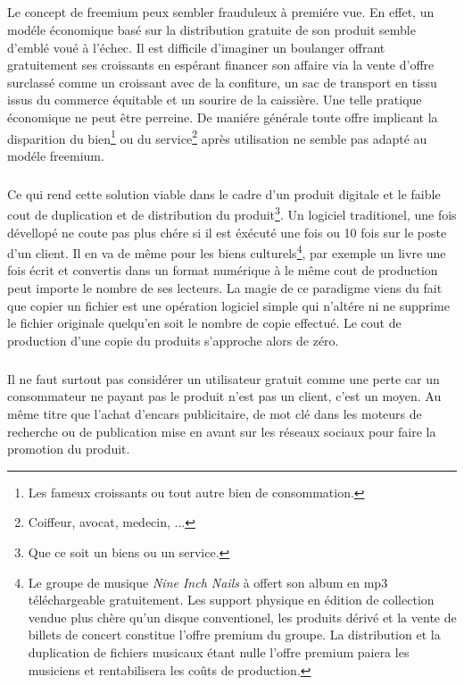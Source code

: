 \documentclass[11pt, a4paper ]{article}
\begin{document}
\begin{spacing}{1.5}
\paragraph{} %
	\subparagraph{} %
Le concept de freemium peux sembler frauduleux à premiére vue. En effet, un modéle économique basé sur la distribution gratuite de son produit semble d'emblé voué à l'échec. Il est difficile d'imaginer un boulanger offrant gratuitement ses croissants en espérant financer son affaire via la vente d'offre surclassé comme un croissant avec de la confiture, un sac de transport en tissu issus du commerce équitable et un sourire de la caissière. Une telle pratique économique ne peut être perreine. De maniére générale toute offre implicant la disparition du bien\footnote{Les fameux croissants ou tout autre bien de consommation.} ou du service\footnote{Coiffeur, avocat, medecin, ...} après utilisation ne semble pas adapté au modéle freemium.
\subparagraph{}
Ce qui rend cette solution viable dans le cadre d'un produit digitale et le faible cout de duplication et de distribution du produit\footnote{Que ce soit un biens ou un service.}. Un logiciel traditionel, une fois dévellopé ne coute pas plus chére si il est éxécuté une fois ou 10 fois sur le poste d'un client. Il en va de même pour les biens culturels\footnote{Le groupe de musique \emph{Nine Inch Nails} à offert son album en mp3 téléchargeable gratuitement. Les support physique en édition de collection vendue plus chère qu'un disque conventionel, les produits dérivé et la vente de billets de concert constitue l'offre premium du groupe. La distribution et la duplication de fichiers musicaux étant nulle l'offre premium paiera les musiciens et rentabilisera les coûts de production.}, par exemple un livre une fois écrit et convertis dans un format numérique à le même cout de production peut importe le nombre de ses lecteurs. La magie de ce paradigme viens du fait que copier un fichier est une opération logiciel simple qui n'altére ni ne supprime le fichier originale quelqu'en soit le nombre de copie effectué. Le cout de production d'une copie du produits s'approche alors de zéro.
\subparagraph{}
Il ne faut surtout pas considérer un utilisateur gratuit comme une perte car un consommateur ne payant pas le produit n'est pas un client, c'est un moyen. Au même titre que l'achat d'encars publicitaire, de mot clé dans les moteurs de recherche ou de publication mise en avant sur les réseaux sociaux pour faire la promotion du produit.

\end{spacing}
\end{document}
